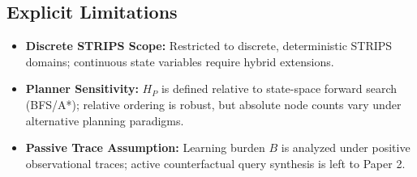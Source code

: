 \documentclass[11pt,a4paper]{article}
\theoremstyle{definition}
\begin{document}
\subsection{Explicit Limitations}
\begin{itemize}[leftmargin=*]
    \item \textbf{Discrete STRIPS Scope:} Restricted to discrete, deterministic STRIPS domains; continuous state variables require hybrid extensions.
    \item \textbf{Planner Sensitivity:} $H_P$ is defined relative to state-space forward search (BFS/A*); relative ordering is robust, but absolute node counts vary under alternative planning paradigms.
    \item \textbf{Passive Trace Assumption:} Learning burden $B$ is analyzed under positive observational traces; active counterfactual query synthesis is left to Paper 2.
\end{itemize}
\end{document}

